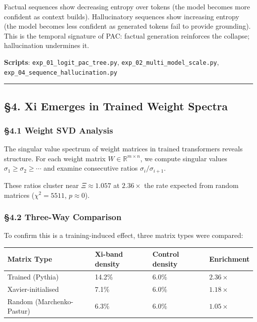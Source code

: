 \documentclass[
  11pt,
  a4paper]{article}
\begin{document}
Factual sequences show decreasing entropy over tokens (the model becomes
more confident as context builds). Hallucinatory sequences show
increasing entropy (the model becomes less confident as generated tokens
fail to provide grounding). This is the temporal signature of PAC:
factual generation reinforces the collapse; hallucination undermines it.

\textbf{Scripts}: \texttt{exp\_01\_logit\_pac\_tree.py},
\texttt{exp\_02\_multi\_model\_scale.py},
\texttt{exp\_04\_sequence\_hallucination.py}

\begin{center}\rule{0.5\linewidth}{0.5pt}\end{center}

\subsection{§4. Xi Emerges in Trained Weight
Spectra}\label{xi-emerges-in-trained-weight-spectra}

\subsubsection{§4.1 Weight SVD Analysis}\label{weight-svd-analysis}

The singular value spectrum of weight matrices in trained transformers
reveals structure. For each weight matrix
\(W \in \mathbb{R}^{m \times n}\), we compute singular values
\(\sigma_1 \geq \sigma_2 \geq \cdots\) and examine consecutive ratios
\(\sigma_i / \sigma_{i+1}\).

These ratios cluster near \(\Xi \approx 1.057\) at \(2.36\times\) the
rate expected from random matrices (\(\chi^2 = 5511\), \(p \approx 0\)).

\subsubsection{§4.2 Three-Way Comparison}\label{three-way-comparison}

To confirm this is a training-induced effect, three matrix types were
compared:

\begin{longtable}[]{@{}llll@{}}
\toprule\noalign{}
Matrix Type & Xi-band density & Control density & Enrichment \\
\midrule\noalign{}
\endhead
\bottomrule\noalign{}
\endlastfoot
Trained (Pythia) & 14.2\% & 6.0\% & \(2.36\times\) \\
Xavier-initialised & 7.1\% & 6.0\% & \(1.18\times\) \\
Random (Marchenko-Pastur) & 6.3\% & 6.0\% & \(1.05\times\) \\
\end{longtable}
\end{document}
